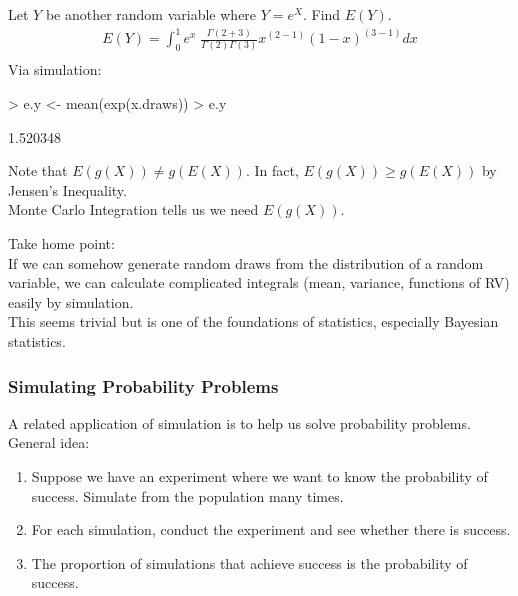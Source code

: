 \documentclass{beamer}
\begin{document}
\begin{frame}[fragile]
Let $Y$ be another random variable where $Y = e^X$.  Find $E(Y)$.
\pause
\begin{eqnarray*}
E(Y) = \int^{1}_{0} e^x \; \frac{\Gamma (2 + 3)}{\Gamma (2)
\Gamma (3)} x^{(2 - 1)} (1 - x)^{(3-1)} dx \\
\end{eqnarray*}
\pause
Via simulation:
\medskip
\tiny
\pause
\begin{Schunk}
\begin{Sinput}
> e.y <- mean(exp(x.draws))
> e.y
\end{Sinput}
\begin{Soutput}
[1] 1.520348
\end{Soutput}
\end{Schunk}
\normalsize
\pause
\bigskip
Note that $E(g(X)) \neq g(E(X))$.  \pause In fact, $E(g(X)) \ge
g(E(X))$ by Jensen's Inequality.\\
\pause
\bigskip
Monte Carlo Integration tells us we need $E(g(X))$.
\end{frame}

\begin{frame}
Take home point: \\
\bigskip
\pause
If we can somehow generate random draws from the distribution of a
random variable, we can calculate complicated integrals (mean,
variance, functions of RV) easily by simulation. \\
\bigskip
\pause
This seems trivial but is one of the foundations of statistics,
especially Bayesian statistics.
\end{frame}

\begin{frame}
\frametitle{Simulating Probability Problems}
\pause
A related application of simulation is to help us solve probability problems.\\
\pause
\bigskip
General idea:
\pause
\begin{enumerate}
\item Suppose we have an experiment where we want to know the probability of
success.  Simulate from the population many times.
\pause
\item For each simulation, conduct the experiment and see whether there is success.
\pause
\item The proportion of simulations that achieve success is the
probability of success.
\end{enumerate}
\end{frame}
\end{document}
